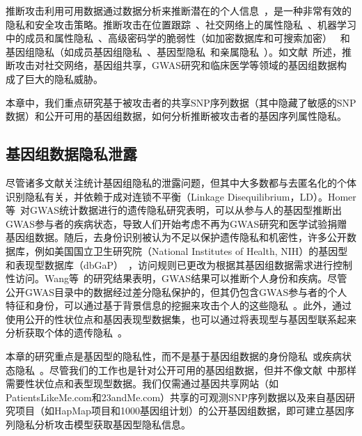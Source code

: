 推断攻击利用可用数据通过数据分析来推断潜在的个人信息~\cite{en2018inference}，是一种非常有效的隐私和安全攻击策略。推断攻击在位置跟踪~\cite{narain2016inferring}、社交网络上的属性隐私~\cite{gong2016you}、机器学习中的成员和属性隐私~\cite{shokri2017membership,ganju2018property}、高级密码学的脆弱性（如加密数据库和可搜索加密）~\cite{pouliot2016shadow} 和基因组隐私（如成员基因组隐私~\cite{wang2009learning}、基因型隐私~\cite{samani2015quantifying,he2017addressing}和亲属隐私~\cite{humbert2013addressing}）。如文献~\cite{ayday2017inference}所述，推断攻击对社交网络，基因组共享，GWAS研究和临床医学等领域的基因组数据构成了巨大的隐私威胁。

本章中，我们重点研究基于被攻击者的共享SNP序列数据（其中隐藏了敏感的SNP数据）和公开可用的基因组数据，如何分析推断被攻击者的基因序列属性隐私。

\subsection{基因组数据隐私泄露}

尽管诸多文献关注统计基因组隐私的泄露问题，但其中大多数都与去匿名化的个体识别隐私有关，并依赖于成对连锁不平衡（Linkage Disequilibrium，LD）。Homer等~\cite{homer2008resolving}对GWAS统计数据进行的遗传隐私研究表明，可以从参与人的基因型推断出GWAS参与者的疾病状态，导致人们开始考虑不再为GWAS研究和医学试验捐赠基因组数据。随后，去身份识别被认为不足以保护遗传隐私和机密性，许多公开数据库，例如美国国立卫生研究院（National Institutes of Health, NIH）的基因型和表现型数据库（dbGaP）~\cite{mailman2007ncbi,nhgri2015privacy}，访问规则已更改为根据其基因组数据需求进行控制性访问。Wang等~\cite{wang2009learning}的研究结果表明，GWAS结果可以推断个人身份和疾病。尽管公开GWAS目录中的数据经过差分隐私保护的，但其仍包含GWAS参与者的个人特征和身份，可以通过基于背景信息的挖掘来攻击个人的这些隐私~\cite{wang2016infringement}。此外，通过使用公开的性状位点和基因表现型数据集，也可以通过将表现型与基因型联系起来分析获取个体的遗传隐私~\cite{harmanci2016quantification}。

本章的研究重点是基因型的隐私性，而不是基于基因组数据的身份隐私~\cite{wang2009learning,wang2016infringement}或疾病状态隐私~\cite{homer2008resolving,wang2009learning}。尽管我们的工作也是针对公开可用的基因组数据，但并不像文献~\cite{wang2009learning,wang2016infringement,harmanci2016quantification}中那样需要性状位点和表型现型数据。我们仅需通过基因共享网站（如PatientsLikeMe.com和23andMe.com）共享的可观测SNP序列数据以及来自基因研究项目（如HapMap项目和1000基因组计划）的公开基因组数据，即可建立基因序列隐私分析攻击模型获取基因型隐私信息。

